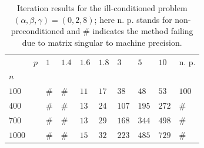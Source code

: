 \documentclass{article}
\begin{document}
\begin{table}[H]
	\caption{$ \left( \alpha, \beta, \gamma \right) = \left( 0, 2, 8 \right) $}
	\begin{tabular}{ll|llllllll}
		& $ p $ & $ 1 $ & $ 1.4 $ & $ 1.6 $ & $ 1.8 $ & $ 3 $  & $ 5 $  & $ 10 $ & n. p. \\
		$ n $    &       &       &         &         &         &        &        &        &                    \\
		$ 100 $  &       & $ \# $ & $ \# $   & $ 11 $   & $ 17 $   & $ 38 $ & $ 48 $ & $ 53 $ & $ 100 $             \\
		\hline
		$ 400 $  &       & $ \# $ & $ \# $   & $ 13 $   & $ 24 $   & $ 107 $ & $ 195 $ & $ 272 $ & $ \# $             \\
		\hline
		$ 700 $  &       & $ \# $ & $ \# $   & $ 13 $   & $ 29 $   & $ 168 $ & $ 344 $ & $ 498 $ & $ \# $             \\
		\hline
		$ 1000 $ &       & $ \# $ & $ \# $   & $ 15 $   & $ 32 $   & $ 223 $ & $ 485 $ & $ 729 $ & $ \# $
	\end{tabular}
	\caption*{Iteration results for the ill-conditioned problem $ \left( \alpha, \beta, \gamma \right) = \left( 0, 2, 8 \right) $; here n. p. stands for non-preconditioned and $ \# $ indicates the method failing due to matrix singular to machine precision.}
	\label{tab:tab_03}
\end{table}
\end{document}

